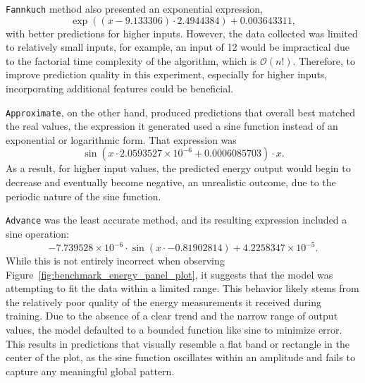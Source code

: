 \texttt{Fannkuch} method also presented an exponential expression,  
\[
\exp\left((x - 9.133306) \cdot 2.4944384\right) + 0.003643311,
\]  
with better predictions for higher inputs. However, the data collected was limited to relatively small inputs, for example, an input of 12 would be impractical due to the factorial time complexity of the algorithm, which is \(\mathcal{O}(n!)\). Therefore, to improve prediction quality in this experiment, especially for higher inputs, incorporating additional features could be beneficial.

\texttt{Approximate}, on the other hand, produced predictions that overall best matched the real values, the expression it generated used a sine function instead of an exponential or logarithmic form. That expression was  
\[
\sin\left(x \cdot 2.0593527 \times 10^{-6} + 0.0006085703\right) \cdot x.
\]  
As a result, for higher input values, the predicted energy output would begin to decrease and eventually become negative, an unrealistic outcome, due to the periodic nature of the sine function.

\texttt{Advance} was the least accurate method, and its resulting expression included a sine operation:  
\[
-7.739528 \times 10^{-6} \cdot \sin(x \cdot -0.81902814) + 4.2258347 \times 10^{-5}.
\]  
While this is not entirely incorrect when observing Figure~\ref{fig:benchmark_energy_panel_plot}, it suggests that the model was attempting to fit the data within a limited range. This behavior likely stems from the relatively poor quality of the energy measurements it received during training. Due to the absence of a clear trend and the narrow range of output values, the model defaulted to a bounded function like sine to minimize error. This results in predictions that visually resemble a flat band or rectangle in the center of the plot, as the sine function oscillates within an amplitude and fails to capture any meaningful global pattern.


